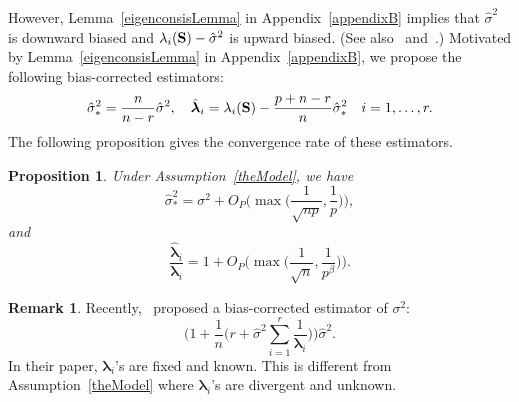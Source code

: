 \documentclass[3p]{elsarticle}
\newcommand{\bfsym}[1]{\ensuremath{\boldsymbol{#1}}}
\def\blambda {\bfsym {\lambda}}        \def\bLambda {\bfsym {\Lambda}}
\theoremstyle{plain}
\newtheorem{proposition}{\quad\quad Proposition}
\theoremstyle{definition}
\newtheorem{remark}{\quad\quad Remark}
\theoremstyle{remark}
\begin{document}
However, Lemma~\ref{eigenconsisLemma} in Appendix~\ref{appendixB} implies that $\hat{\sigma}^2$ is downward biased and $\lambda_i(\mathbf{S})-\hat{\sigma}^2$ is upward biased.
(See also~\cite{Passemier2015} and~\cite{Fan2015Asymptotics}.)
Motivated by Lemma~\ref{eigenconsisLemma} in Appendix~\ref{appendixB}, we propose the following bias-corrected estimators:
$$
\hat{\sigma}_*^2= \frac{n}{n-r} \hat{\sigma}^2,
\quad
\hat{\blambda}_i=\lambda_i(\BS)-\frac{p+n-r}{n}\hat{\sigma}_*^2
\quad i=1,\ldots,r.
$$
The following proposition gives the convergence rate of these estimators.
\begin{proposition}\label{varianceEstimation}
    Under Assumption~\ref{theModel}, we have %
    \begin{equation}\label{varianceEstimationPropResult1}
    \hat{\sigma}_*^2=\sigma^2 + O_P\Big(\max \big(\frac{1}{\sqrt{np}},\frac{1}{p}\big)\Big),
    \end{equation}
    and
    \begin{equation}\label{varianceEstimationPropResult2}
        \frac{\hat{\blambda}_i}{\blambda_i}
        =
        1+
        O_P\Big(\max\big(\frac{1}{\sqrt{n}},\frac{1}{p^{\beta}}\big)\Big).
    \end{equation}
\end{proposition}
\begin{remark}
Recently,~\cite{Passemier2015} proposed a bias-corrected estimator of $\sigma^2$:
$$
\Big(1+\frac{1}{n}\big(r+\hat{\sigma}^2\sum_{i=1}^r \frac{1}{\blambda_i}\big)\Big)\hat{\sigma}^2.
$$
In their paper, $\blambda_i$'s are fixed and known.
    This is different from Assumption~\ref{theModel} where $\blambda_i$'s are divergent and unknown.
\end{remark}
\end{document}

